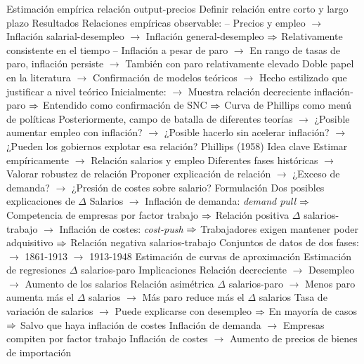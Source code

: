 \documentclass{nuevotema}
\begin{document}
\begin{esquemal}
				\4[] Estimación empírica relación output-precios
				\4[] Definir relación entre corto y largo plazo
				\4 Resultados
				\4[] Relaciones empíricas observable:
				\4[] -- Precios y empleo
				\4[] $\to$ Inflación salarial-desempleo
				\4[] $\to$ Inflación general-desempleo
				\4[] $\Rightarrow$ Relativamente consistente en el tiempo
				\4[] -- Inflación a pesar de paro
				\4[] $\to$ En rango de tasas de paro, inflación persiste
				\4[] $\to$ También con paro relativamente elevado
				\4[] Doble papel en la literatura
				\4[] $\to$ Confirmación de modelos teóricos
				\4[] $\to$ Hecho estilizado que justificar a nivel teórico
				\4[] Inicialmente:
				\4[] $\to$ Muestra relación decreciente inflación-paro
				\4[] $\Rightarrow$ Entendido como confirmación de SNC
				\4[] $\Rightarrow$ Curva de Phillips como menú de políticas
				\4[] Posteriormente, campo de batalla de diferentes teorías
				\4[] $\to$ ¿Posible aumentar empleo con inflación?
				\4[] $\to$ ¿Posible hacerlo sin acelerar inflación?
				\4[] $\to$ ¿Pueden los gobiernos explotar esa relación?
			\3 Phillips (1958)
				\4 Idea clave
				\4[] Estimar empíricamente
				\4[] $\to$ Relación salarios y empleo
				\4[] Diferentes fases históricas
				\4[] $\to$ Valorar robustez de relación
				\4[] Proponer explicación de relación
				\4[] $\to$ ¿Exceso de demanda?
				\4[] $\to$ ¿Presión de costes sobre salario?
				\4 Formulación
				\4[] Dos posibles explicaciones de $\Delta$ Salarios
				\4[] $\to$ Inflación de demanda: \textit{demand pull}
				\4[] $\Rightarrow$ Competencia de empresas por factor trabajo
				\4[] $\Rightarrow$ Relación positiva $\Delta$ salarios-trabajo
				\4[] $\to$ Inflación de costes: \textit{cost-push}
				\4[] $\Rightarrow$ Trabajadores exigen mantener poder adquisitivo
				\4[] $\Rightarrow$ Relación negativa salarios-trabajo
				\4[] Conjuntos de datos de dos fases:
				\4[] $\to$ 1861-1913
				\4[] $\to$ 1913-1948
				\4[] Estimación de curvas de aproximación
				\4[] Estimación de regresiones $\Delta$ salarios-paro
				\4 Implicaciones
				\4[] Relación decreciente
				\4[] $\to$ Desempleo
				\4[] $\to$ Aumento de los salarios
				\4[] Relación asimétrica $\Delta$ salarios-paro
				\4[] $\to$ Menos paro aumenta más el $\Delta$ salarios
				\4[] $\to$ Más paro reduce más el $\Delta$ salarios
				\4[] Tasa de variación de salarios
				\4[] $\to$ Puede explicarse con desempleo
				\4[] $\Rightarrow$ En mayoría de casos
				\4[] $\Rightarrow$ Salvo que haya inflación de costes
				\4[] Inflación de demanda
				\4[] $\to$ Empresas compiten por factor trabajo
				\4[] Inflación de costes
				\4[] $\to$ Aumento de precios de bienes de importación

\end{esquemal}
\end{document}
